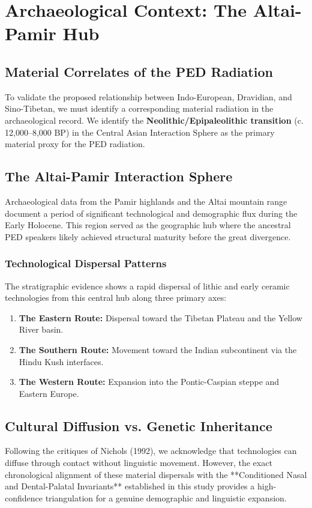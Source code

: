 \chapter{Archaeological Context: The Altai-Pamir Hub}

\section{Material Correlates of the PED Radiation}
To validate the proposed relationship between Indo-European, Dravidian, and Sino-Tibetan, we must identify a corresponding material radiation in the archaeological record. We identify the \textbf{Neolithic/Epipaleolithic transition} (c. 12,000--8,000 BP) in the Central Asian Interaction Sphere as the primary material proxy for the PED radiation.

\section{The Altai-Pamir Interaction Sphere}
Archaeological data from the Pamir highlands and the Altai mountain range document a period of significant technological and demographic flux during the Early Holocene. This region served as the geographic hub where the ancestral PED speakers likely achieved structural maturity before the great divergence.

\subsection{Technological Dispersal Patterns}
The stratigraphic evidence shows a rapid dispersal of lithic and early ceramic technologies from this central hub along three primary axes:
\begin{enumerate}
    \item \textbf{The Eastern Route:} Dispersal toward the Tibetan Plateau and the Yellow River basin.
    \item \textbf{The Southern Route:} Movement toward the Indian subcontinent via the Hindu Kush interfaces.
    \item \textbf{The Western Route:} Expansion into the Pontic-Caspian steppe and Eastern Europe.
\end{enumerate}

\section{Cultural Diffusion vs. Genetic Inheritance}
Following the critiques of Nichols (1992), we acknowledge that technologies can diffuse through contact without linguistic movement. However, the exact chronological alignment of these material dispersals with the **Conditioned Nasal and Dental-Palatal Invariants** established in this study provides a high-confidence triangulation for a genuine demographic and linguistic expansion.

